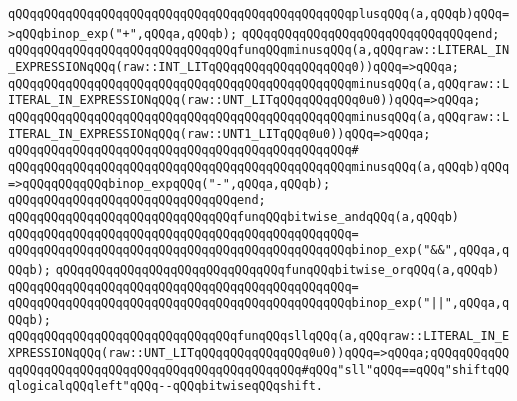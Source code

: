 \newline
\verb|qQQqqQQqqQQqqQQqqQQqqQQqqQQqqQQqqQQqqQQqqQQqqQQqplusqQQq(a,qQQqb)qQQq=>qQQqbinop_exp("+",qQQqa,qQQqb);|\newline
\verb|qQQqqQQqqQQqqQQqqQQqqQQqqQQqqQQqend;|\newline
\newline
\verb|qQQqqQQqqQQqqQQqqQQqqQQqqQQqqQQqfunqQQqminusqQQq(a,qQQqraw::LITERAL_IN_EXPRESSIONqQQq(raw::INT_LITqQQqqQQqqQQqqQQqqQQq0))qQQq=>qQQqa;|\newline
\verb|qQQqqQQqqQQqqQQqqQQqqQQqqQQqqQQqqQQqqQQqqQQqqQQqminusqQQq(a,qQQqraw::LITERAL_IN_EXPRESSIONqQQq(raw::UNT_LITqQQqqQQqqQQq0u0))qQQq=>qQQqa;|\newline
\verb|qQQqqQQqqQQqqQQqqQQqqQQqqQQqqQQqqQQqqQQqqQQqqQQqminusqQQq(a,qQQqraw::LITERAL_IN_EXPRESSIONqQQq(raw::UNT1_LITqQQq0u0))qQQq=>qQQqa;|\newline
\verb|qQQqqQQqqQQqqQQqqQQqqQQqqQQqqQQqqQQqqQQqqQQqqQQq#|\newline
\verb|qQQqqQQqqQQqqQQqqQQqqQQqqQQqqQQqqQQqqQQqqQQqqQQqminusqQQq(a,qQQqb)qQQq=>qQQqqQQqqQQqbinop_expqQQq("-",qQQqa,qQQqb);|\newline
\verb|qQQqqQQqqQQqqQQqqQQqqQQqqQQqqQQqend;|\newline
\newline
\newline
\verb|qQQqqQQqqQQqqQQqqQQqqQQqqQQqqQQqfunqQQqbitwise_andqQQq(a,qQQqb)|\newline
\verb|qQQqqQQqqQQqqQQqqQQqqQQqqQQqqQQqqQQqqQQqqQQqqQQq=|\newline
\verb|qQQqqQQqqQQqqQQqqQQqqQQqqQQqqQQqqQQqqQQqqQQqqQQqbinop_exp("&&",qQQqa,qQQqb);|\newline
\newline
\newline
\verb|qQQqqQQqqQQqqQQqqQQqqQQqqQQqqQQqfunqQQqbitwise_orqQQq(a,qQQqb)|\newline
\verb|qQQqqQQqqQQqqQQqqQQqqQQqqQQqqQQqqQQqqQQqqQQqqQQq=|\newline
\verb|qQQqqQQqqQQqqQQqqQQqqQQqqQQqqQQqqQQqqQQqqQQqqQQqbinop_exp("|\verb#||",qQQqa,qQQqb);#\newline
\newline
\newline
\verb|qQQqqQQqqQQqqQQqqQQqqQQqqQQqqQQqfunqQQqsllqQQq(a,qQQqraw::LITERAL_IN_EXPRESSIONqQQq(raw::UNT_LITqQQqqQQqqQQqqQQq0u0))qQQq=>qQQqa;qQQqqQQqqQQqqQQqqQQqqQQqqQQqqQQqqQQqqQQqqQQqqQQqqQQq#qQQq"sll"qQQq==qQQq"shiftqQQqlogicalqQQqleft"qQQq--qQQqbitwiseqQQqshift.|\newline
